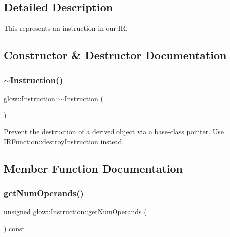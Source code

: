 \subsection{Detailed Description}
This represents an instruction in our IR. 

\subsection{Constructor \& Destructor Documentation}
\mbox{\label{classglow_1_1_instruction_a2e92685aa7341dd5251930b1a5860e61}} 
\subsubsection{\texorpdfstring{$\sim$\+Instruction()}{~Instruction()}}
{\footnotesize\ttfamily glow\+::\+Instruction\+::$\sim$\+Instruction (\begin{DoxyParamCaption}{ }\end{DoxyParamCaption})\hspace{0.3cm}{\ttfamily [inline]}}

Prevent the destruction of a derived object via a base-\/class pointer. \hyperlink{structglow_1_1_use}{Use} I\+R\+Function\+::destroy\+Instruction instead. 

\subsection{Member Function Documentation}
\mbox{\label{classglow_1_1_instruction_a6a6369ae28aa26f79aeb185dc18bf5bb}} 
\subsubsection{\texorpdfstring{get\+Num\+Operands()}{getNumOperands()}}
{\footnotesize\ttfamily unsigned glow\+::\+Instruction\+::get\+Num\+Operands (\begin{DoxyParamCaption}{ }\end{DoxyParamCaption}) const\hspace{0.3cm}{\ttfamily [inline]}}

